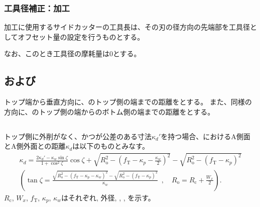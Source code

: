 \subsubsection{工具径補正：\Keyway 加工}
\Keyway 加工に使用するサイドカッターの工具長は、その刃の径方向の先端部を工具径としてオフセット量の設定を行うものとする。

なお、このとき工具径の摩耗量は0とする。


\subsection{\KeywayPos および\KeywayWidth}
トップ端から垂直方向に、\Keyway のトップ側の端までの距離を\KeywayPos とする。
また、同様の方向に、\Keyway のトップ側の端から\Keyway のボトム側の端までの距離を\KeywayWidth とする。


\subsection{\KeywayDepth}
トップ側に外削がなく、かつ\AsideKeywayDepth が公差のある寸法$\kappa_d'$を持つ場合、\KeywayCenter における\Keyway A側面とA側外面との距離$\kappa_d$は以下のものとみなす。
\begin{gather*}
  \kappa_d
  = \frac{2\kappa_d'-\kappa_w\sin\zeta}{1+\cos^2\zeta}\cos\zeta
    +\sqrt{R_\mathrm o^2-\left(f_\mathrm T-\kappa_p-\frac{\kappa_w}2\right)^2}
    -\sqrt{R_\mathrm o^2-\left(f_\mathrm T-\kappa_p\right)^2}\\[3pt]
  \left(
  \tan\zeta
  = \frac{\sqrt{R_\mathrm o^2-\left(f_\mathrm T-\kappa_p-\kappa_w\right)^2}
          -\sqrt{R_\mathrm o^2-\left(f_\mathrm T-\kappa_p\right)^2}}
         {\kappa_w}
    ~~, \quad
    R_\mathrm o = R_\mathrm c+\frac{W_x}2
  \right).
\end{gather*}
$R_\mathrm c$, $W_x$, $f_\mathrm T$, $\kappa_p$, $\kappa_w$はそれぞれ\CenterCurvatureRadius, 外径, \TopAlocationLength, \KeywayPos, \KeywayWidth を示す。

